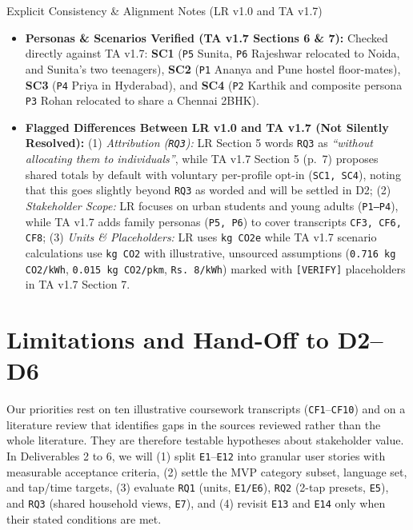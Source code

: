\documentclass[12pt, a4paper]{article}
\begin{document}
\begin{checkcard}{Explicit Consistency \& Alignment Notes (LR v1.0 and TA v1.7)}
\footnotesize
\begin{itemize}
    \item \textbf{Personas \& Scenarios Verified (TA v1.7 Sections 6 \& 7):} Checked directly against TA v1.7: \textbf{SC1} (\texttt{P5} Sunita, \texttt{P6} Rajeshwar relocated to Noida, and Sunita's two teenagers), \textbf{SC2} (\texttt{P1} Ananya and Pune hostel floor-mates), \textbf{SC3} (\texttt{P4} Priya in Hyderabad), and \textbf{SC4} (\texttt{P2} Karthik and composite persona \texttt{P3} Rohan relocated to share a Chennai 2BHK).
    \item \textbf{Flagged Differences Between LR v1.0 and TA v1.7 (Not Silently Resolved):} (1) \textit{Attribution (\texttt{RQ3}):} LR Section 5 words \texttt{RQ3} as \textit{``without allocating them to individuals''}, while TA v1.7 Section 5 (p.\ 7) proposes shared totals by default with voluntary per-profile opt-in (\texttt{SC1, SC4}), noting that this goes slightly beyond \texttt{RQ3} as worded and will be settled in D2; (2) \textit{Stakeholder Scope:} LR focuses on urban students and young adults (\texttt{P1--P4}), while TA v1.7 adds family personas (\texttt{P5, P6}) to cover transcripts \texttt{CF3, CF6, CF8}; (3) \textit{Units \& Placeholders:} LR uses \texttt{kg CO2e} while TA v1.7 scenario calculations use \texttt{kg CO2} with illustrative, unsourced assumptions (\texttt{0.716 kg CO2/kWh}, \texttt{0.015 kg CO2/pkm}, \texttt{Rs.\ 8/kWh}) marked with \texttt{[VERIFY]} placeholders in TA v1.7 Section 7.
\end{itemize}
\end{checkcard}

\section{Limitations and Hand-Off to D2--D6}
Our priorities rest on ten illustrative coursework transcripts (\texttt{CF1}--\texttt{CF10}) \cite{cf1,cf10} and on a literature review that identifies gaps in the sources reviewed rather than the whole literature. They are therefore testable hypotheses about stakeholder value. In Deliverables 2 to 6, we will (1) split \texttt{E1}--\texttt{E12} into granular user stories with measurable acceptance criteria, (2) settle the MVP category subset, language set, and tap/time targets, (3) evaluate \texttt{RQ1} (units, \texttt{E1/E6}), \texttt{RQ2} (2-tap presets, \texttt{E5}), and \texttt{RQ3} (shared household views, \texttt{E7}), and (4) revisit \texttt{E13} and \texttt{E14} only when their stated conditions are met.
\end{document}
